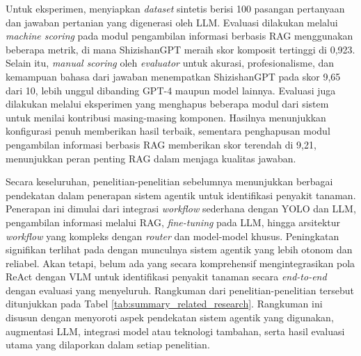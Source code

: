 Untuk eksperimen, \textcite{yangShizishanGPTAgriculturalLarge2024} menyiapkan \textit{dataset} sintetis berisi 100 pasangan pertanyaan dan jawaban pertanian yang digenerasi oleh LLM. Evaluasi dilakukan melalui \textit{machine scoring} pada modul pengambilan informasi berbasis RAG menggunakan beberapa metrik, di mana ShizishanGPT meraih skor komposit tertinggi di 0,923. Selain itu, \textit{manual scoring} oleh \textit{evaluator} untuk akurasi, profesionalisme, dan kemampuan bahasa dari jawaban menempatkan ShizishanGPT pada skor 9,65 dari 10, lebih unggul dibanding GPT-4 maupun model lainnya. Evaluasi juga dilakukan melalui eksperimen yang menghapus beberapa modul dari sistem untuk menilai kontribusi masing-masing komponen. Hasilnya menunjukkan konfigurasi penuh memberikan hasil terbaik, sementara penghapusan modul pengambilan informasi berbasis RAG memberikan skor terendah di 9,21, menunjukkan peran penting RAG dalam menjaga kualitas jawaban. 

Secara keseluruhan, penelitian-penelitian sebelumnya menunjukkan berbagai pendekatan dalam penerapan sistem agentik untuk identifikasi penyakit tanaman. Penerapan ini dimulai dari integrasi \textit{workflow} sederhana dengan YOLO dan LLM, pengambilan informasi melalui RAG, \textit{fine-tuning} pada LLM, hingga arsitektur \textit{workflow} yang kompleks dengan \textit{router} dan model-model khusus. Peningkatan signifikan terlihat pada \textcite{xuMultimodalAgriculturalAgent2025} dengan munculnya sistem agentik yang lebih otonom dan reliabel. Akan tetapi, belum ada yang secara komprehensif mengintegrasikan pola ReAct dengan VLM untuk identifikasi penyakit tanaman secara \textit{end-to-end} dengan evaluasi yang menyeluruh. Rangkuman dari penelitian-penelitian tersebut ditunjukkan pada Tabel \ref{tab:summary_related_research}. Rangkuman ini disusun dengan menyoroti aspek pendekatan sistem agentik yang digunakan, augmentasi LLM, integrasi model atau teknologi tambahan, serta hasil evaluasi utama yang dilaporkan dalam setiap penelitian.

